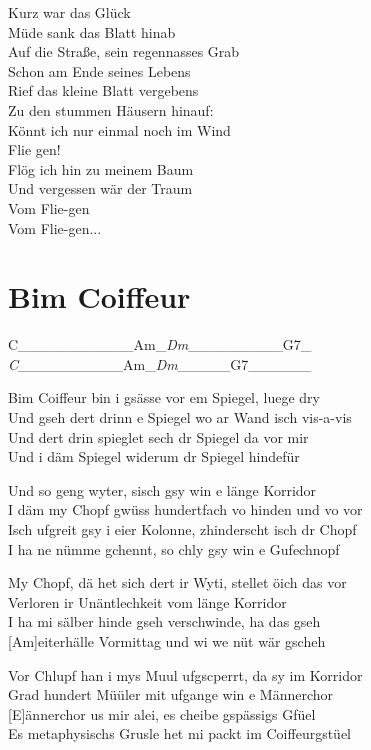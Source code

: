 \documentclass[
  letterpaper,
]{scrbook}
\begin{document}
Kurz war das Glück\\
Müde sank das Blatt hinab\\
Auf die Straße, sein regennasses Grab\\
Schon am Ende seines Lebens\\
Rief das kleine Blatt vergebens\\
Zu den stummen Häusern hinauf:\\
Könnt ich nur einmal noch im Wind\\
Flie gen!\\
Flög ich hin zu meinem Baum\\
Und vergessen wär der Traum\\
Vom Flie-gen\\
Vom Flie-gen...

\hypertarget{bim-coiffeur}{%
\chapter{Bim Coiffeur}\label{bim-coiffeur}}

\textbar C\_\_\_\_\_\_\_\textbar\_\_\_\_Am\_\emph{\textbar Dm}\_\_\_\_\_\textbar\_\_\_\_G7\_\emph{\textbar{}\\
\textbar C}\_\_\_\_\_\_\textbar\_\_\_\_Am\_\emph{\textbar Dm}\_\_\_\_\_\textbar G7\_\_\_\_\_\_\textbar{}

Bim Coiffeur bin i gsässe vor em Spiegel, luege dry\\
Und gseh dert drinn e Spiegel wo ar Wand isch vis-a-vis\\
Und dert drin spieglet sech dr Spiegel da vor mir\\
Und i däm Spiegel widerum dr Spiegel hindefür

Und so geng wyter, s\textquotesingle isch gsy win e länge Korridor\\
I däm my Chopf gwüss hundertfach vo hinden und vo vor\\
Isch ufgreit gsy i eier Kolonne, z\textquotesingle hinderscht isch dr
Chopf\\
I ha ne nümme gchennt, so chly gsy win e Gufechnopf

My Chopf, dä het sich dert ir Wyti, stellet öich das vor\\
Verloren ir Unäntlechkeit vom länge Korridor\\
I ha mi sälber hinde gseh verschwinde, ha das gseh\\
{[}Am{]}eiterhälle Vormittag und wi we nüt wär gscheh

Vor Chlupf han i mys Muul ufgscperrt, da sy im Korridor\\
Grad hundert Müüler mit ufgange win e Männerchor\\
{[}E{]}ännerchor us mir alei, es cheibe gspässigs Gfüel\\
Es metaphysischs Grusle het mi packt im Coiffeurgstüel
\end{document}
